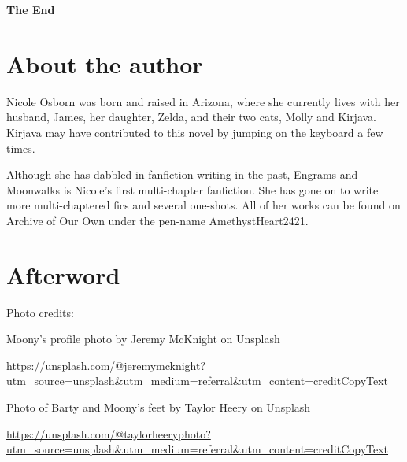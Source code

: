\documentclass[12pt,twoside,openright]{memoir}
\begin{document}
\textbf{The End} 
\backmatter

\chapter*{About the author}
Nicole Osborn was born and raised in Arizona, where she currently lives with her husband, James, her daughter, Zelda, and their two cats, Molly and Kirjava. Kirjava may have contributed to this novel by jumping on the keyboard a few times.

Although she has dabbled in fanfiction writing in the past, Engrams and Moonwalks is Nicole’s first multi-chapter fanfiction. She has gone on to write more multi-chaptered fics and several one-shots. All of her works can be found on Archive of Our Own under the pen-name AmethystHeart2421.

\begin{center}
{
	\abnormalparskip{0em}
}
\end{center}

\chapter*{Afterword}
Photo credits:

Moony's profile photo by Jeremy McKnight on Unsplash

\href{https://unsplash.com/@jeremymcknight?utm_source=unsplash&utm_medium=referral&utm_content=creditCopyText}{\url{https://unsplash.com/@jeremymcknight?utm_source=unsplash&utm_medium=referral&utm_content=creditCopyText}}

Photo of Barty and Moony's feet by Taylor Heery on Unsplash 

\href{https://unsplash.com/@taylorheeryphoto?utm_source=unsplash&utm_medium=referral&utm_content=creditCopyText}{\url{https://unsplash.com/@taylorheeryphoto?utm_source=unsplash&utm_medium=referral&utm_content=creditCopyText}}
\end{document}
